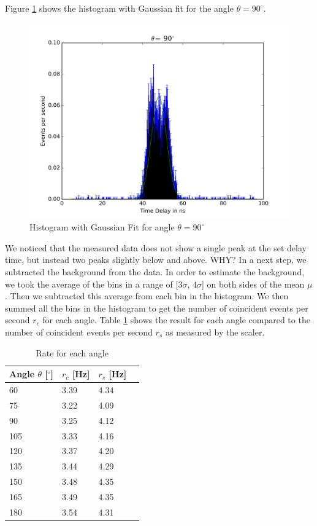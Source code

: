 \documentclass[a4paper,parskip,11pt, DIV12]{scrreprt}
\begin{document}
Figure \ref{fig:hist120} shows the histogram with Gaussian fit for the angle $\theta = 90^{\circ}$.
%
\begin{figure}[H]
\centering
\includegraphics[scale=0.65]{90deg.png}
\caption[Histogram]{Histogram with Gaussian Fit for angle $\theta = 90^{\circ}$}
\label{fig:hist120}
\end{figure}
%
We noticed that the measured data does not show a single peak at the set delay time, but instead two peaks slightly below and above. WHY? In a next step, we subtracted the background from the data. In order to estimate the background, we took the average of the bins in a range of [$3\sigma$, $4\sigma$] on both sides of the mean $\mu$. Then we subtracted this average from each bin in the histogram. We then summed all the bins in the histogram to get the number of coincident events per second $r_c$ for each angle. Table \ref{tab:nevents} shows the result for each angle compared to the number of coincident events per second $r_{s}$ as measured by the scaler.
%
\begin{table}[H]
\begin{center}
\begin{tabular}{llll}
Angle $\theta$ [$^{\circ}$] & $r_{c}$ [Hz] & $r_{s}$ [Hz]\\
\hline
60 	& 3.39 & 4.34\\
  75 	& 3.22 & 4.09\\
  90 	& 3.25 & 4.12\\
105 	& 3.33 & 4.16\\
120	& 3.37 & 4.20\\
135	& 3.44 & 4.29\\
150	& 3.48 & 4.35\\
165	& 3.49 & 4.35\\
180	& 3.54 & 4.31\\ 
\end{tabular}
\caption{Rate for each angle}
\label{tab:nevents}
\end{center}
\end{table}
\end{document}
